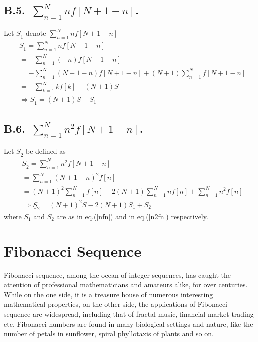 \begin{multicols}{2}
\subsection*{B.5.~$\displaystyle{\sum_{n=1}^{N}nf[N+1-n]}$.}
Let $\underline{S}_1$ denote $\displaystyle{\sum_{n=1}^{N}nf[N+1-n]}$
\begin{align*}
&\underline{S}_1 = \displaystyle{\sum_{n=1}^{N}nf[N+1-n]}\nonumber\\
&= -\displaystyle{\sum_{n=1}^{N}(-n)f[N+1-n]}\nonumber\\
&= - \displaystyle{\sum_{n=1}^{N}(N+1-n)f[N+1-n]} + (N+1)\displaystyle{\sum_{n=1}^{N}f[N+1-n]}\nonumber\\
&= - \displaystyle{\sum_{k=1}^{N}kf[k] + (N+1)\bar{S}}\nonumber\\
&\Rightarrow  \underline{S}_1 = (N+1)\bar{S} - \bar{S}_1\tag{B.14}\label{eq-B.14}
\end{align*}

\subsection*{B.6.~$\displaystyle{\sum_{n=1}^{N}n^2f[N+1-n]}$.}
Let $\underline{S}_2$ be defined as
\begin{align*}
&\underline{S}_2  = \displaystyle{\sum_{n=1}^{N}n^2f[N+1-n]}\nonumber\\
&= \displaystyle{\sum_{n=1}^{N}(N+1-n)^2f[n]}\nonumber\\
&= (N+1)^2 \displaystyle{\sum_{n=1}^Nf[n]} - 2(N+1)\displaystyle{\sum_{n=1}^N nf[n]} + \displaystyle{\sum_{n=1}^N n^2f[n]}\nonumber\\
&\Rightarrow \underline{S}_2 = (N+1)^2\bar{S} -2(N+1)\bar{S}_1 + \bar{S}_2\tag{B.15}\label{eq-B.15}
\end{align*}
where $\bar{S}_1$ and $\bar{S}_2$ are as in eq.(\ref{nfn}) and in eq.(\ref{n2fn}) respectively.


\section{Fibonacci Sequence}\label{section-21}

Fibonacci sequence, among the ocean of integer sequences, has caught the attention of professional mathematicians and amateurs alike, for over centuries. While on the one side, it is a treasure house of numerous interesting mathematical properties, on the other side, the applications of Fibonacci sequence are widespread, including that of fractal music, financial market trading etc. Fibonacci numbers are found in many biological settings and nature, like the number of petals in sunflower, spiral phyllotaxis of plants and so on.


\end{multicols}
